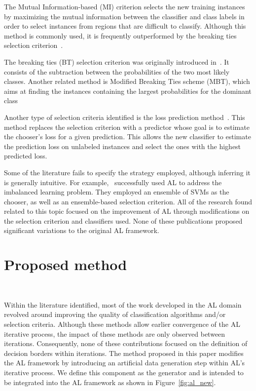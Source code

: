 \documentclass[remotesensing,article,submit,moreauthors,pdftex]{Definitions/mdpi}
\begin{document}
The Mutual Information-based (MI) criterion selects the new training instances
by maximizing the mutual information between the classifier and class labels
in order to select instances from regions that are difficult to classify.
Although this method is commonly used, it is frequently outperformed by the
breaking ties selection criterion~\cite{Li2011,Liu2018}.

The breaking ties (BT) selection criterion was originally introduced
in~\cite{Luo2003}. It consists of the subtraction between the probabilities of
the two most likely classes. Another related method is Modified Breaking Ties
scheme (MBT), which aims at finding the instances containing the largest
probabilities for the dominant class~\cite{Liu2018,Li2013a}

Another type of selection criteria identified is the loss prediction
method~\cite{Yoo2019}. This method replaces the selection criterion with a
predictor whose goal is to estimate the chooser's loss for a given
prediction. This allows the new classifier to estimate the prediction loss on
unlabeled instances and select the ones with the highest predicted loss.

Some of the literature fails to specify the strategy employed, although
inferring it is generally intuitive. For example,~\cite{Ertekin2007}
successfully used AL to address the imbalanced learning problem. They employed
an ensemble of SVMs as the chooser, as well as an ensemble-based selection
criterion. All of the research found related to this topic focused on the
improvement of AL through modifications on the selection criterion and
classifiers used. None of these publications proposed significant variations
to the original AL framework.

\section{Proposed method}~\label{sec:proposed-method}

Within the literature identified, most of the work developed in the AL domain
revolved around improving the quality of classification algorithms and/or
selection criteria. Although these methods allow earlier convergence of the
AL iterative process, the impact of these methods are only observed between
iterations. Consequently, none of these contributions focused on the
definition of decision borders within iterations. The method proposed in this
paper modifies the AL framework by introducing an artificial data generation
step within AL's iterative process. We define this component as the generator
and is intended to be integrated into the AL framework as shown in
Figure~\ref{fig:al_new}. 
\end{document}
